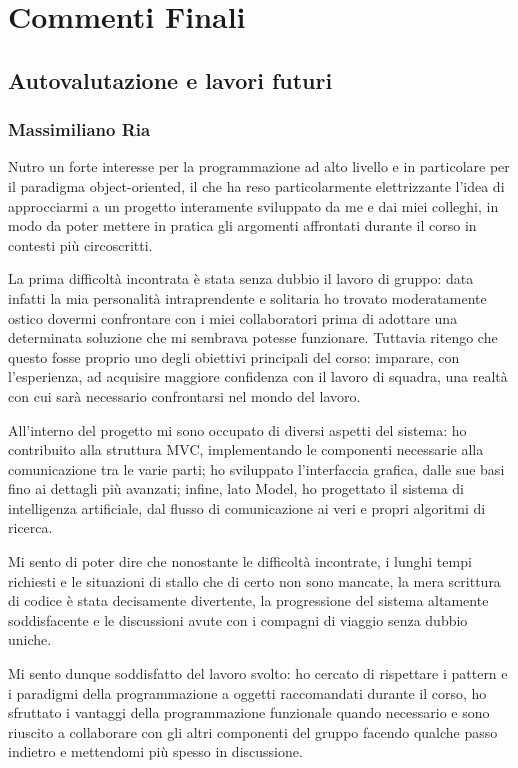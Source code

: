 \chapter{Commenti Finali}

\section{Autovalutazione e lavori futuri}

\subsection{Massimiliano Ria}

Nutro un forte interesse per la programmazione ad alto livello e in particolare per il paradigma object-oriented, il che ha reso particolarmente elettrizzante l'idea di approcciarmi
a un progetto interamente sviluppato da me e dai miei colleghi, in modo da poter mettere in pratica gli argomenti affrontati durante il corso in contesti più circoscritti. 

La prima difficoltà incontrata è stata senza dubbio il lavoro di gruppo: data infatti la mia personalità intraprendente e solitaria ho trovato moderatamente ostico dovermi
confrontare con i miei collaboratori prima di adottare una determinata soluzione che mi sembrava potesse funzionare. Tuttavia ritengo che questo fosse proprio uno degli obiettivi principali 
del corso: imparare, con l'esperienza, ad acquisire maggiore confidenza con il lavoro di squadra, una realtà con cui sarà necessario confrontarsi nel mondo del lavoro.

All'interno del progetto mi sono occupato di diversi aspetti del sistema: ho contribuito alla struttura MVC, implementando le componenti necessarie alla comunicazione tra le varie
parti; ho sviluppato l'interfaccia grafica, dalle sue basi fino ai dettagli più avanzati; infine, lato Model, ho progettato il sistema di intelligenza artificiale, dal flusso di comunicazione
ai veri e propri algoritmi di ricerca.

Mi sento di poter dire che nonostante le difficoltà incontrate, i lunghi tempi richiesti e le situazioni di stallo che di certo non sono mancate,
la mera scrittura di codice è stata decisamente divertente, la progressione del sistema altamente soddisfacente e le discussioni avute con i compagni di viaggio senza dubbio uniche.

Mi sento dunque soddisfatto del lavoro svolto: ho cercato di rispettare i pattern e i paradigmi della programmazione a oggetti raccomandati durante il corso, ho sfruttato i vantaggi
della programmazione funzionale quando necessario e sono riuscito a collaborare con gli altri componenti del gruppo facendo qualche passo indietro e mettendomi più spesso in discussione.


